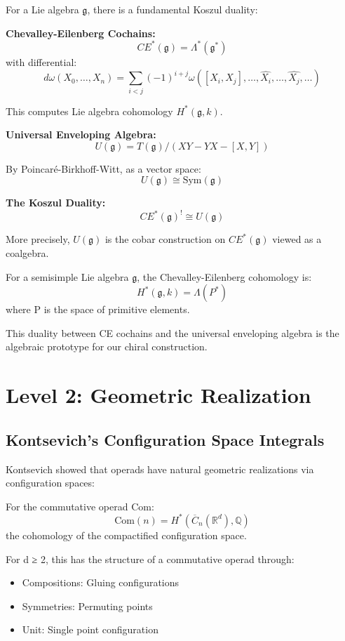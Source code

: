 \begin{example}\label{ex:CE-UE-classical}
For a Lie algebra $\mathfrak{g}$, there is a fundamental Koszul duality:

\textbf{Chevalley-Eilenberg Cochains:}
$$CE^*(\mathfrak{g}) = \Lambda^*(\mathfrak{g}^*)$$
with differential:
$$d\omega(X_0, \ldots, X_n) = \sum_{i<j} (-1)^{i+j} \omega([X_i, X_j], \ldots, \widehat{X_i}, \ldots, \widehat{X_j}, \ldots)$$

This computes Lie algebra cohomology $H^*(\mathfrak{g}, k)$.

\textbf{Universal Enveloping Algebra:}
$$U(\mathfrak{g}) = T(\mathfrak{g}) / (XY - YX - [X,Y])$$

By Poincaré-Birkhoff-Witt, as a vector space:
$$U(\mathfrak{g}) \cong \text{Sym}(\mathfrak{g})$$

\textbf{The Koszul Duality:}
$$CE^*(\mathfrak{g})^! \cong U(\mathfrak{g})$$

More precisely, $U(\mathfrak{g})$ is the cobar construction on $CE^*(\mathfrak{g})$ viewed as a coalgebra.
\end{example}

\begin{theorem}\label{thm:kostant-classical}
For a semisimple Lie algebra $\mathfrak{g}$, the Chevalley-Eilenberg cohomology is:
$$H^*(\mathfrak{g}, k) = \Lambda(P^*)$$
where P is the space of primitive elements.

This duality between CE cochains and the universal enveloping algebra is the algebraic prototype for our chiral construction.
\end{theorem}

\section{Level 2: Geometric Realization}

\subsection{Kontsevich's Configuration Space Integrals}

\begin{construction}\label{const:geom-real-operads}
Kontsevich showed that operads have natural geometric realizations via configuration spaces:

For the commutative operad Com:
$$\text{Com}(n) = H^*(\overline{C}_n(\mathbb{R}^d), \mathbb{Q})$$
the cohomology of the compactified configuration space.

For d ≥ 2, this has the structure of a commutative operad through:
\begin{itemize}
\item Compositions: Gluing configurations
\item Symmetries: Permuting points
\item Unit: Single point configuration
\end{itemize}
\end{construction}


